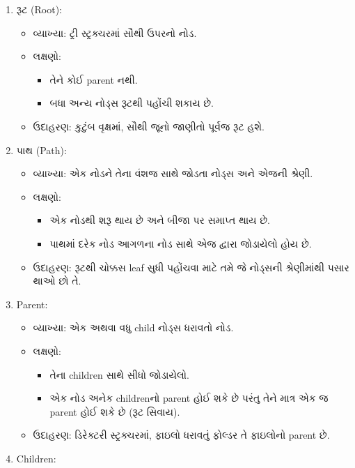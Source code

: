 \begin{enumerate}
\def\labelenumi{\arabic{enumi}.}
\tightlist
\item
  રૂટ (Root):

  \begin{itemize}
  \tightlist
  \item
    વ્યાખ્યા: ટ્રી સ્ટ્રક્ચરમાં સૌથી ઉપરનો નોડ.
  \item
    લક્ષણો:

    \begin{itemize}
    \tightlist
    \item
      તેને કોઈ parent નથી.
    \item
      બધા અન્ય નોડ્સ રૂટથી પહોંચી શકાય છે.
    \end{itemize}
  \item
    ઉદાહરણ: કુટુંબ વૃક્ષમાં, સૌથી જૂનો જાણીતો પૂર્વજ રૂટ હશે.
  \end{itemize}
\item
  પાથ (Path):

  \begin{itemize}
  \tightlist
  \item
    વ્યાખ્યા: એક નોડને તેના વંશજ સાથે જોડતા નોડ્સ અને એજની શ્રેણી.
  \item
    લક્ષણો:

    \begin{itemize}
    \tightlist
    \item
      એક નોડથી શરૂ થાય છે અને બીજા પર સમાપ્ત થાય છે.
    \item
      પાથમાં દરેક નોડ આગળના નોડ સાથે એજ દ્વારા જોડાયેલો હોય છે.
    \end{itemize}
  \item
    ઉદાહરણ: રૂટથી ચોક્કસ leaf સુધી પહોંચવા માટે તમે જે નોડ્સની શ્રેણીમાંથી પસાર થાઓ
    છો તે.
  \end{itemize}
\item
  Parent:

  \begin{itemize}
  \tightlist
  \item
    વ્યાખ્યા: એક અથવા વધુ child નોડ્સ ધરાવતો નોડ.
  \item
    લક્ષણો:

    \begin{itemize}
    \tightlist
    \item
      તેના children સાથે સીધો જોડાયેલો.
    \item
      એક નોડ અનેક childrenનો parent હોઈ શકે છે પરંતુ તેને માત્ર એક જ parent હોઈ
      શકે છે (રૂટ સિવાય).
    \end{itemize}
  \item
    ઉદાહરણ: ડિરેક્ટરી સ્ટ્રક્ચરમાં, ફાઇલો ધરાવતું ફોલ્ડર તે ફાઇલોનો parent છે.
  \end{itemize}
\item
  Children:


\end{enumerate}
